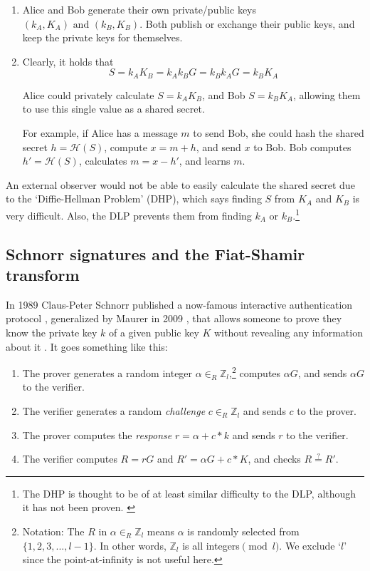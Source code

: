 \begin{enumerate}
	\item Alice and Bob generate their own private/public keys \((k_A, K_A) \textrm{ and } (k_B, K_B)\). Both publish or exchange their public keys, and keep the private keys for themselves.

	\item Clearly, it holds that \[S = k_A K_B = k_A k_B G = k_B k_A G = k_B K_A\]

	Alice could privately calculate \(S = k_A K_B\), and Bob \(S = k_B K_A\), allowing them to use this single value as a shared secret.

	For example, if Alice has a message $m$ to send Bob, she could hash the shared secret \(h = \mathcal{H}(S)\), compute $x = m + h$, and send $x$ to Bob. Bob computes $h' = \mathcal{H}(S)$, calculates $m = x - h'$, and learns $m$.
\end{enumerate}   

An external observer would not be able to easily calculate the shared secret due to the `Diffie-Hellman Problem' (DHP), which says finding $S$ from $K_A$ and $K_B$ is very difficult. Also, the DLP prevents them from finding $k_A$ or $k_B$.\footnote{The DHP is thought to be of at least similar difficulty to the DLP, although it has not been proven. \cite{galbraith-diffie-hellman-problem}}


\subsection{Schnorr signatures and the Fiat-Shamir transform}
\label{sec:schnorr-fiat-shamir}

In 1989 Claus-Peter Schnorr published a now-famous interactive authentication protocol \cite{schnorr-signatures}, generalized by Maurer in 2009 \cite{simple-zk-proof-maurer}, that allows someone to prove they know the private key $k$ of a given public key $K$ without revealing any information about it \cite{Signatures2015BorromeanRS}. It goes something like this:
\begin{enumerate}
	\item The prover generates a random integer \(\alpha \in_R \mathbb{Z}_l\),\footnote{\label{notation3_note}Notation: The $R$ in \(\alpha \in_R \mathbb{Z}_l\) means $\alpha$ is randomly selected from \(\{1,2,3,...,l-1\}\). In other words, $\mathbb{Z}_l$ is all integers$\pmod l$. We exclude `$l$' since the point-at-infinity is not useful here.} computes $\alpha G$, and sends $\alpha G$ to the verifier.
	\item The verifier generates a random {\em challenge} $c \in_R \mathbb{Z}_l$ and sends $c$ to the prover.
	\item The prover computes the {\em response} $r = \alpha + c*k$ and sends $r$ to the verifier.
	\item The verifier computes $R = r G$ and $R' = \alpha G + c*K$, and checks $R \stackrel{?}{=} R'$.
\end{enumerate}

